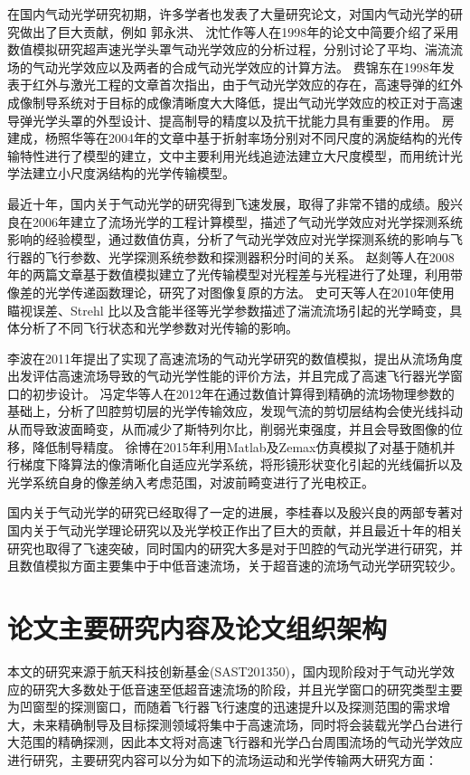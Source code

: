 在国内气动光学研究初期，许多学者也发表了大量研究论文，对国内气动光学的研究做出了巨大贡献，例如
郭永洪、 沈忙作等人在1998年的论文中简要介绍了采用数值模拟研究超声速光学头罩气动光学效应的分析过程，分别讨论了平均、湍流流场的气动光学效应以及两者的合成气动光学效应的计算方法\cite{gyh1998}。
费锦东\cite{fjd1998}在1998年发表于红外与激光工程的文章首次指出，由于气动光学效应的存在，高速导弹的红外成像制导系统对于目标的成像清晰度大大降低，提出气动光学效应的校正对于高速导弹光学头罩的外型设计、提高制导的精度以及抗干扰能力具有重要的作用。
房建成，杨照华等在2004年的文章中基于折射率场分别对不同尺度的涡旋结构的光传输特性进行了模型的建立，文中主要利用光线追迹法建立大尺度模型，而用统计光学法建立小尺度涡结构的光学传输模型\cite{fjc2004}。

最近十年，国内关于气动光学的研究得到飞速发展，取得了非常不错的成绩\cite{xie2007}。殷兴良在2006年建立了流场光学的工程计算模型，描述了气动光学效应对光学探测系统影响的经验模型，通过数值仿真，分析了气动光学效应对光学探测系统的影响与飞行器的飞行参数、光学探测系统参数和探测器积分时间的关系\cite{yxl2006gsfxq}。
赵剡等人在2008年的两篇文章基于数值模拟建立了光传输模型对光程差与光程进行了处理，利用带像差的光学传递函数理论，研究了对图像复原的方法\cite{zhao2008,zhaoz2008}。
史可天等人在2010年使用瞄视误差、Strehl 比以及含能半径等光学参数描述了湍流流场引起的光学畸变，具体分析了不同飞行状态和光学参数对光传输的影响\cite{skt2010}。

李波在2011年提出了实现了高速流场的气动光学研究的数值模拟，提出从流场角度出发评估高速流场导致的气动光学性能的评价方法，并且完成了高速飞行器光学窗口的初步设计\cite{libo2011}。
冯定华等人在2012年在通过数值计算得到精确的流场物理参数的基础上，分析了凹腔剪切层的光学传输效应，发现气流的剪切层结构会使光线抖动从而导致波面畸变，从而减少了斯特列尔比，削弱光束强度，并且会导致图像的位移，降低制导精度\cite{fdh2012}。
徐博在2015年利用Matlab及Zemax仿真模拟了对基于随机并行梯度下降算法的像清晰化自适应光学系统，将形镜形状变化引起的光线偏折以及光学系统自身的像差纳入考虑范围，对波前畸变进行了光电校正\cite{xubo2015}。
 
国内关于气动光学的研究已经取得了一定的进展，李桂春以及殷兴良的两部专著对国内关于气动光学理论研究以及光学校正作出了巨大的贡献\cite{yang2009,li2011}，并且最近十年的相关研究也取得了飞速突破，同时国内的研究大多是对于凹腔的气动光学进行研究，并且数值模拟方面主要集中于中低音速流场，关于超音速的流场气动光学研究较少。
\section{论文主要研究内容及论文组织架构}
本文的研究来源于航天科技创新基金(SAST201350)，国内现阶段对于气动光学效应的研究大多数处于低音速至低超音速流场的阶段，并且光学窗口的研究类型主要为凹窗型的探测窗口，而随着飞行器飞行速度的迅速提升以及探测范围的需求增大，未来精确制导及目标探测领域将集中于高速流场，同时将会装载光学凸台进行大范围的精确探测，因此本文将对高速飞行器和光学凸台周围流场的气动光学效应进行研究，主要研究内容可以分为如下的流场运动和光学传输两大研究方面：

